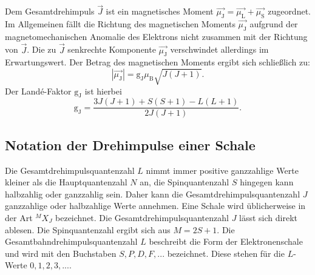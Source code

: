 Dem Gesamtdrehimpuls $\vec{J}$ ist ein magnetisches Moment $\vec{\mu_{\mathrm{J}}}=\vec{\mu_{\mathrm{L}}}+\vec{\mu_{\mathrm{S}}}$ zugeordnet.
Im Allgemeinen fällt die Richtung des magnetischen Moments $\vec{\mu_{\mathrm{J}}}$ aufgrund der magnetomechanischen Anomalie des Elektrons nicht zusammen mit der Richtung von $\vec{J}$. Die zu $\vec{J}$ senkrechte Komponente $\vec{\mu_{\mathrm{J}}}$ verschwindet allerdings im Erwartungswert.
Der Betrag des magnetischen Moments ergibt sich schließlich zu:
\begin{equation}
  |\vec{\mu_{\mathrm{J}}}|=\mathrm{g_J}\mu_{\mathrm{B}}\sqrt{J(J+1)}\mathrm{.}
\end{equation}
Der Landé-Faktor $\mathrm{g_J}$ ist hierbei
\begin{equation}
  \label{eqn:lande}
  \mathrm{g_J}=\frac{3J(J+1)+S(S+1)-L(L+1)}{2J(J+1)}\mathrm{.}
\end{equation}
\subsection{Notation der Drehimpulse einer Schale}
Die Gesamtdrehimpulsquantenzahl $L$ nimmt immer positive ganzzahlige Werte kleiner als die Hauptquantenzahl $N$ an, die Spinquantenzahl $S$ hingegen kann halbzahlig oder ganzzahlig sein. Daher kann die Gesamtdrehimpulsquantenzahl $J$ ganzzahlige oder halbzahlige Werte annehmen.
Eine Schale wird üblicherweise in der Art ${^{M}X_J}$ bezeichnet.
Die Gesamtdrehimpulsquantenzahl $J$ lässt sich direkt ablesen. Die Spinquantenzahl ergibt sich aus $M=2S+1$. Die Gesamtbahndrehimpulsquantenzahl $L$ beschreibt die Form der Elektronenschale und wird mit den Buchstaben $S,P,D,F,...$ bezeichnet. Diese stehen für die $L$-Werte $0,1,2,3,...$.

